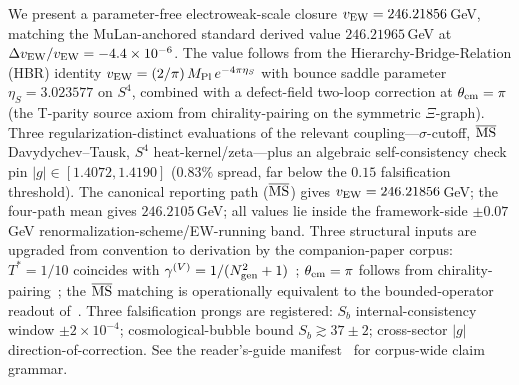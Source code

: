 %

We present a parameter-free electroweak-scale closure
$v_{\rm EW} = 246.21856$\,GeV, matching the MuLan-anchored standard
derived value $246.21965$\,GeV at $\Delta v_{\rm EW}/v_{\rm EW} =
-4.4\times 10^{-6}$. The value follows from the Hierarchy-Bridge-Relation
(HBR) identity $v_{\rm EW} = (2/\pi)\,M_{\rm Pl}\,e^{-4\pi\eta_{S}}$
with bounce saddle parameter $\eta_{S}=3.023577$ on $S^{4}$, combined
with a defect-field two-loop correction at $\theta_{\rm em}=\pi$
(the T-parity source axiom from chirality-pairing on the symmetric
$\Xi$-graph). Three regularization-distinct evaluations of the
relevant coupling---$\sigma$-cutoff, $\overline{\rm MS}$
Davydychev--Tausk, $S^{4}$ heat-kernel/zeta---plus an algebraic
self-consistency check pin $|g|\in[1.4072,1.4190]$ ($0.83\%$ spread,
far below the $0.15$ falsification threshold). The canonical reporting path ($\overline{\rm MS}$) gives
$v_{\rm EW}=246.21856$\,GeV; the four-path mean gives
$246.2105$\,GeV; all values lie inside the framework-side
$\pm 0.07$\,GeV renormalization-scheme/EW-running band.
Three structural inputs are upgraded from convention to
derivation by the companion-paper corpus: $T^{*}=1/10$
coincides with $\gamma^{(V)}=1/(N_{\rm gen}^{2}+1)$~\cite{Paper6};
$\theta_{\rm em}=\pi$ follows from chirality-pairing~\cite{Paper4A};
the $\overline{\rm MS}$ matching is operationally equivalent to
the bounded-operator readout of~\cite{Paper2}. Three falsification
prongs are registered: $S_{b}$ internal-consistency window
$\pm 2\times 10^{-4}$; cosmological-bubble bound
$S_{b}\gtrsim 37\pm 2$; cross-sector $|g|$
direction-of-correction. See the reader's-guide
manifest~\cite{Paper0} for corpus-wide claim grammar.
